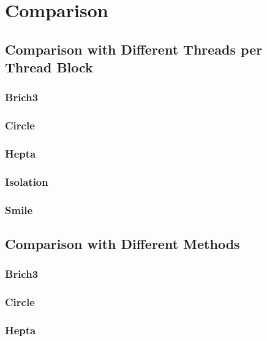 \section{Comparison}
\subsection{Comparison with Different Threads per Thread Block}

\subsubsection{Brich3}


\subsubsection{Circle}


\subsubsection{Hepta}


\subsubsection{Isolation}


\subsubsection{Smile}



\subsection{Comparison with Different Methods}

\subsubsection{Brich3}


\subsubsection{Circle}


\subsubsection{Hepta}


